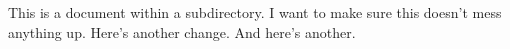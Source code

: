 \documentclass[a4paper]{article}
\begin{document}
This is a document within a subdirectory.
I want to make sure this doesn't mess anything up.
Here's another change.
And here's another.
\end{document}
